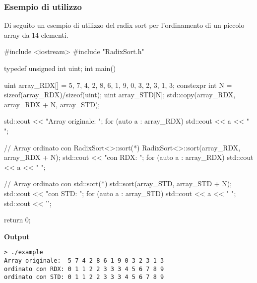 \subsubsection{Esempio di utilizzo}
Di seguito un esempio di utilizzo del radix sort per l'ordinamento di un piccolo array da 14 elementi.
\begin{cpp}[caption={%
		Esempio di funzionamento dell'implementazione del radix-sort per ordinare un array utilizzando la CPU.
		L'array in input \texttt{array\_RDX} ha dimensione 14 ed è stato copiato in \texttt{array\_STD} per la verifica di correttezza.
		\\
		Interfaccia e funzionamento di \texttt{RadixSort<>::sort(*)} sono simili a \texttt{std::sort(*)} della STD del C++.
		\\\\
		Nelle parentesi angolari della classe (\texttt{RadixSort<>}) è possibile specificare la dimensione in bit della radice ed
		il numero di radici da utilizzare per l'ordinamento. In questo esempio, la chiamata  
		\texttt{RadixSort<4,1>::sort(*)} avrebbe consentito di risparmiare 3 iterazioni inutili e usare meno bins.
	},%
	label={example-2-code}, captionpos=t]
#include <iostream>
#include "RadixSort.h"

typedef unsigned int uint;
int main(){
	uint array_RDX[] = {5, 7, 4, 2, 8, 6, 1, 9, 0, 3, 2, 3, 1, 3}; 
	constexpr int N = sizeof(array_RDX)/sizeof(uint);
	uint array_STD[N];
	std::copy(array_RDX, array_RDX + N, array_STD);
	
	std::cout << "Array originale:  ";
	for (auto a : array_RDX) std::cout << a << " ";
	
	// Array ordinato con RadixSort<>::sort(*)
	RadixSort<>::sort(array_RDX, array_RDX + N);    
	std::cout << "\nordinato con RDX: ";
	for (auto a : array_RDX) std::cout << a << " ";
	
	// Array ordinato con std::sort(*)
	std::sort(array_STD, array_STD + N);             
	std::cout << "\nordinato con STD: ";
	for (auto a : array_STD) std::cout << a << " ";
	std::cout << '\n';
	
	return 0;
}
\end{cpp}

\bigskip
\textbf{Output}
\begin{lstlisting}[style=console, caption={Output dell'esempio. Come è possibile vedere gli output coincidono.}, label={execution-2}]
> ./example
Array originale:  5 7 4 2 8 6 1 9 0 3 2 3 1 3
ordinato con RDX: 0 1 1 2 2 3 3 3 4 5 6 7 8 9
ordinato con STD: 0 1 1 2 2 3 3 3 4 5 6 7 8 9
\end{lstlisting}






